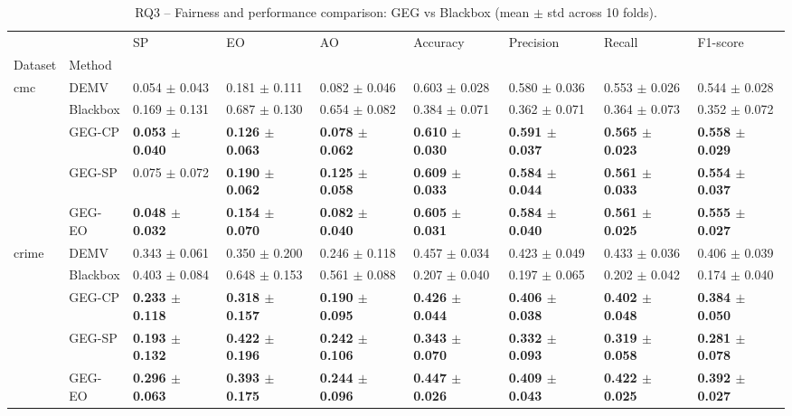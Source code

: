 \begin{table}
\caption{RQ3 -- Fairness and performance comparison: GEG vs Blackbox (mean $\pm$ std across 10 folds).}
\label{tab:rq3_results}
\begin{tabular}{lllllllll}
\toprule
 &  & SP & EO & AO & Accuracy & Precision & Recall & F1-score \\
Dataset & Method &  &  &  &  &  &  &  \\
\midrule
\multirow[t]{5}{*}{cmc} & DEMV & 0.054 $\pm$ 0.043 & 0.181 $\pm$ 0.111 & 0.082 $\pm$ 0.046 & 0.603 $\pm$ 0.028 & 0.580 $\pm$ 0.036 & 0.553 $\pm$ 0.026 & 0.544 $\pm$ 0.028 \\
 & Blackbox & 0.169 $\pm$ 0.131 & 0.687 $\pm$ 0.130 & 0.654 $\pm$ 0.082 & 0.384 $\pm$ 0.071 & 0.362 $\pm$ 0.071 & 0.364 $\pm$ 0.073 & 0.352 $\pm$ 0.072 \\
 & GEG-CP & \textbf{0.053 $\pm$ 0.040} & \textbf{0.126 $\pm$ 0.063} & \textbf{0.078 $\pm$ 0.062} & \textbf{0.610 $\pm$ 0.030} & \textbf{0.591 $\pm$ 0.037} & \textbf{0.565 $\pm$ 0.023} & \textbf{0.558 $\pm$ 0.029} \\
 & GEG-SP & 0.075 $\pm$ 0.072 & \textbf{0.190 $\pm$ 0.062} & \textbf{0.125 $\pm$ 0.058} & \textbf{0.609 $\pm$ 0.033} & \textbf{0.584 $\pm$ 0.044} & \textbf{0.561 $\pm$ 0.033} & \textbf{0.554 $\pm$ 0.037} \\
 & GEG-EO & \textbf{0.048 $\pm$ 0.032} & \textbf{0.154 $\pm$ 0.070} & \textbf{0.082 $\pm$ 0.040} & \textbf{0.605 $\pm$ 0.031} & \textbf{0.584 $\pm$ 0.040} & \textbf{0.561 $\pm$ 0.025} & \textbf{0.555 $\pm$ 0.027} \\
\cline{1-9}
\multirow[t]{5}{*}{crime} & DEMV & 0.343 $\pm$ 0.061 & 0.350 $\pm$ 0.200 & 0.246 $\pm$ 0.118 & 0.457 $\pm$ 0.034 & 0.423 $\pm$ 0.049 & 0.433 $\pm$ 0.036 & 0.406 $\pm$ 0.039 \\
 & Blackbox & 0.403 $\pm$ 0.084 & 0.648 $\pm$ 0.153 & 0.561 $\pm$ 0.088 & 0.207 $\pm$ 0.040 & 0.197 $\pm$ 0.065 & 0.202 $\pm$ 0.042 & 0.174 $\pm$ 0.040 \\
 & GEG-CP & \textbf{0.233 $\pm$ 0.118} & \textbf{0.318 $\pm$ 0.157} & \textbf{0.190 $\pm$ 0.095} & \textbf{0.426 $\pm$ 0.044} & \textbf{0.406 $\pm$ 0.038} & \textbf{0.402 $\pm$ 0.048} & \textbf{0.384 $\pm$ 0.050} \\
 & GEG-SP & \textbf{0.193 $\pm$ 0.132} & \textbf{0.422 $\pm$ 0.196} & \textbf{0.242 $\pm$ 0.106} & \textbf{0.343 $\pm$ 0.070} & \textbf{0.332 $\pm$ 0.093} & \textbf{0.319 $\pm$ 0.058} & \textbf{0.281 $\pm$ 0.078} \\
 & GEG-EO & \textbf{0.296 $\pm$ 0.063} & \textbf{0.393 $\pm$ 0.175} & \textbf{0.244 $\pm$ 0.096} & \textbf{0.447 $\pm$ 0.026} & \textbf{0.409 $\pm$ 0.043} & \textbf{0.422 $\pm$ 0.025} & \textbf{0.392 $\pm$ 0.027} \\

\end{tabular}
\end{table}
